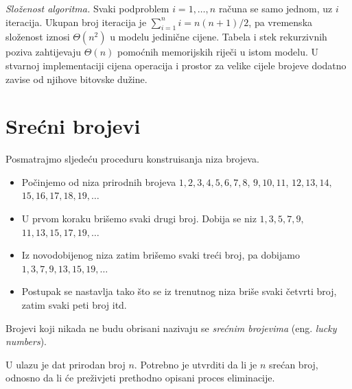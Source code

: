 \emph{Složenost algoritma.} Svaki podproblem $i=1,\ldots,n$ računa se samo jednom, uz $i$ iteracija. Ukupan broj iteracija je $\sum_{i=1}^n i=n(n+1)/2$, pa vremenska složenost iznosi $\Theta(n^2)$ u modelu jedinične cijene. Tabela i stek rekurzivnih poziva zahtijevaju $\Theta(n)$ pomoćnih memorijskih riječi u istom modelu. U stvarnoj implementaciji cijena operacija i prostor za velike cijele brojeve dodatno zavise od njihove bitovske dužine.

\section{Srećni brojevi}
 
 Posmatrajmo sljedeću proceduru konstruisanja niza brojeva.
 
 \begin{itemize}
 	\item Počinjemo od niza prirodnih brojeva
 	$1, 2, 3, 4, 5, 6, 7, 8$, $9, 10, 11$, $12, 13, 14,$ $15, 16, 17, 18, 19,\ldots 	$
 	
 	\item U prvom koraku brišemo svaki drugi broj. Dobija se niz $1, 3, 5, 7, 9,$ $11, 13, 15, 17, 19,\ldots$
 	
 	\item Iz novodobijenog niza zatim brišemo svaki treći broj, pa dobijamo $
 	1, 3, 7, 9, 13, 15, 19,\ldots
 	$
 	
 	\item Postupak se nastavlja tako što se iz trenutnog niza briše svaki četvrti broj, zatim svaki peti broj itd.
 	
 \end{itemize}
 
 Brojevi koji nikada ne budu obrisani nazivaju se \textit{srećnim brojevima} (eng. \textit{lucky numbers}).
 
 \medskip
 
 U ulazu je dat prirodan broj $n$. Potrebno je utvrditi da li je $n$ srećan broj, odnosno da li će preživjeti prethodno opisani proces eliminacije.
 
